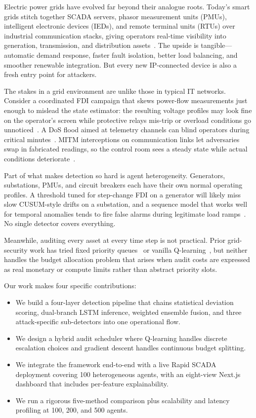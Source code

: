 \documentclass[conference]{IEEEtran}
\begin{document}
Electric power grids have evolved far beyond their analogue roots. Today's smart grids stitch together SCADA servers, phasor measurement units (PMUs), intelligent electronic devices (IEDs), and remote terminal units (RTUs) over industrial communication stacks, giving operators real-time visibility into generation, transmission, and distribution assets~\cite{b1}. The upside is tangible---automatic demand response, faster fault isolation, better load balancing, and smoother renewable integration. But every new IP-connected device is also a fresh entry point for attackers.

The stakes in a grid environment are unlike those in typical IT networks. Consider a coordinated FDI campaign that skews power-flow measurements just enough to mislead the state estimator: the resulting voltage profiles may look fine on the operator's screen while protective relays mis-trip or overload conditions go unnoticed~\cite{b2}. A DoS flood aimed at telemetry channels can blind operators during critical minutes~\cite{b3}. MITM interceptions on communication links let adversaries swap in fabricated readings, so the control room sees a steady state while actual conditions deteriorate~\cite{b4}.

Part of what makes detection so hard is agent heterogeneity. Generators, substations, PMUs, and circuit breakers each have their own normal operating profiles. A threshold tuned for step-change FDI on a generator will likely miss slow CUSUM-style drifts on a substation, and a sequence model that works well for temporal anomalies tends to fire false alarms during legitimate load ramps~\cite{b5}. No single detector covers everything.

Meanwhile, auditing every asset at every time step is not practical. Prior grid-security work has tried fixed priority queues~\cite{b6} or vanilla Q-learning~\cite{b7}, but neither handles the budget allocation problem that arises when audit costs are expressed as real monetary or compute limits rather than abstract priority slots.

Our work makes four specific contributions:
\begin{itemize}
\item We build a four-layer detection pipeline that chains statistical deviation scoring, dual-branch LSTM inference, weighted ensemble fusion, and three attack-specific sub-detectors into one operational flow.
\item We design a hybrid audit scheduler where Q-learning handles discrete escalation choices and gradient descent handles continuous budget splitting.
\item We integrate the framework end-to-end with a live Rapid SCADA deployment covering 100 heterogeneous agents, with an eight-view Next.js dashboard that includes per-feature explainability.
\item We run a rigorous five-method comparison plus scalability and latency profiling at 100, 200, and 500 agents.
\end{itemize}
\end{document}
